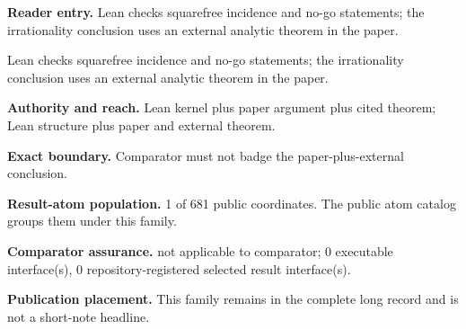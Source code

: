 \textbf{Reader entry.} Lean checks squarefree incidence and no-go statements; the irrationality conclusion uses an external analytic theorem in the paper.

Lean checks squarefree incidence and no-go statements; the irrationality conclusion uses an external analytic theorem in the paper.

\textbf{Authority and reach.} Lean kernel plus paper argument plus cited theorem; Lean structure plus paper and external theorem.

\textbf{Exact boundary.} Comparator must not badge the paper-plus-external conclusion.

\textbf{Result-atom population.} 1 of 681 public coordinates. The public atom catalog groups them under this family.

\textbf{Comparator assurance.} not applicable to comparator; 0 executable interface(s), 0 repository-registered selected result interface(s).

\textbf{Publication placement.} This family remains in the complete long record and is not a short-note headline.
